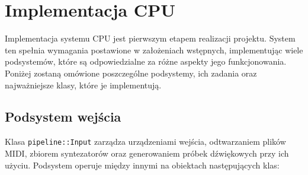 \chapter{Implementacja CPU}
Implementacja systemu CPU jest pierwszym etapem realizacji projektu. System ten spełnia wymagania postawione w założeniach wstępnych, implementując wiele podsystemów, które są odpowiedzialne za różne aspekty jego funkcjonowania. Poniżej zostaną omówione poszczególne podsystemy, ich zadania oraz najważniejsze klasy, które je implementują.

\section{Podsystem wejścia}
Klasa \texttt{pipeline::Input} zarządza urządzeniami wejścia, odtwarzaniem plików MIDI, zbiorem syntezatorów oraz generowaniem próbek dźwiękowych przy ich użyciu. Podsystem operuje między innymi na obiektach następujących klas:
